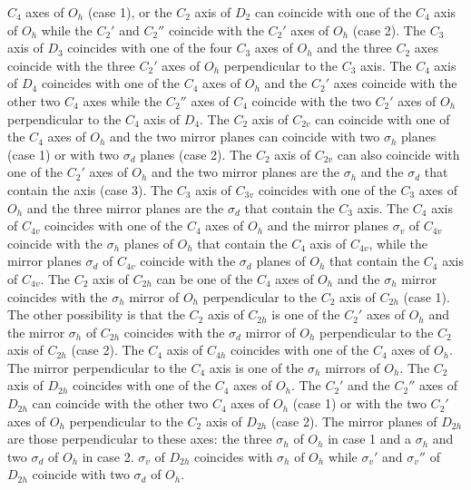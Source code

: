 \documentclass[12pt,a4paper]{article}
\begin{document}
$C_4$ axes of $O_h$ (case 1), or the $C_2$ axis of $D_2$ can coincide with one
of the $C_4$ axis of $O_h$ while the $C_2'$ and $C_2''$ coincide 
with the $C_2'$ axes of $O_h$ (case 2). The $C_3$ axis of $D_3$ coincides with
one of the four $C_3$ axes of $O_h$ and the three $C_2$ axes coincide with
the three $C_2'$ axes of $O_h$ perpendicular to the $C_3$ axis. The $C_4$
axis of $D_4$ coincides with one of the $C_4$ axes of $O_h$ and the
$C_2'$ axes coincide with the other two $C_4$ axes while the $C_2''$ axes
of $C_4$ coincide with the two $C_2'$ axes of $O_h$ perpendicular to the
$C_4$ axis of $D_4$. The $C_2$ axis of $C_{2v}$ can coincide with one of
the $C_4$ axes of $O_h$ and the two mirror planes can coincide with two
$\sigma_h$ planes (case 1) or with two $\sigma_d$ planes (case 2). The
$C_2$ axis of $C_{2v}$ can also coincide with one of the $C_2'$ axes
of $O_h$ and the two mirror planes are the $\sigma_h$ and the $\sigma_d$ 
that contain the axis (case 3).
The $C_3$ axis of $C_{3v}$ coincides with one of the $C_3$ axes of $O_h$ and
the three mirror planes are the $\sigma_d$ that contain the $C_3$ axis.
The $C_4$ axis of $C_{4v}$ coincides with one of the $C_4$ axes of $O_h$
and the mirror planes $\sigma_v$ of $C_{4v}$ coincide with the $\sigma_h$
planes of $O_h$ that contain the $C_4$ axis of $C_{4v}$, 
while the mirror planes $\sigma_d$ of $C_{4v}$ coincide
with the $\sigma_d$ planes of $O_h$ that contain the $C_4$ axis of $C_{4v}$.
The $C_2$ axis of $C_{2h}$ can be one of the $C_4$ axes of $O_h$ and
the $\sigma_h$ mirror coincides with the $\sigma_h$ mirror of $O_h$ 
perpendicular to the $C_2$ axis of $C_{2h}$ (case 1).
The other possibility is that the $C_2$ axis of $C_{2h}$ is one of 
the $C_2'$ axes of $O_h$ and the mirror $\sigma_h$ of $C_{2h}$ coincides with
the $\sigma_d$ mirror of $O_h$ perpendicular to the $C_2$ axis of $C_{2h}$
(case 2). The $C_4$ axis of $C_{4h}$ coincides with one of the
$C_4$ axes of $O_h$. The mirror perpendicular to the $C_4$ axis is one of
the $\sigma_h$ mirrors of $O_h$. 
The $C_2$ axis of $D_{2h}$ coincides with one of the $C_4$ axes of $O_h$. 
The $C_2'$ and the $C_2''$ axes of $D_{2h}$ can coincide with the other two 
$C_4$ axes of $O_h$ (case 1) or with the two $C_2'$ axes of $O_h$
perpendicular to the $C_2$ axis of $D_{2h}$ (case 2). The mirror planes of 
$D_{2h}$ are those 
perpendicular to these axes: the three $\sigma_h$ of $O_h$ in case 1 and a
$\sigma_h$ and two $\sigma_d$ of $O_h$ in case 2. $\sigma_v$ of $D_{2h}$
coincides with $\sigma_h$ of $O_h$ while $\sigma_v'$ and $\sigma_v''$
of $D_{2h}$ coincide with two $\sigma_d$ of $O_h$.
\end{document}
